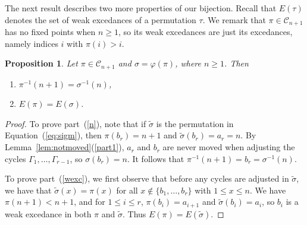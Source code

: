 \documentclass[11pt]{amsart}
\newtheorem{prop}[theorem]{Proposition}
\newcommand\ben{\begin{enumerate}}
\newcommand\een{\end{enumerate}}
\newcommand\C{\mathcal C}
\newcommand\wt{\widetilde}
\newcommand\bij{\varphi}
\newcommand\sigm{\wt\sigma}
\begin{document}
The next result describes two more properties of our bijection. Recall that $E(\tau)$ denotes the set of weak excedances of a permutation $\tau$.
We remark that $\pi\in\C_{n+1}$ has no fixed points when $n\ge1$, so its weak excedances are just its excedances, namely indices $i$ with $\pi(i)>i$.

\begin{prop}\label{prop:properties}
Let $\pi\in\C_{n+1}$ and $\sigma=\bij(\pi)$, where $n\ge1$. Then \ben
\item\label{n} $\pi^{-1}(n+1)=\sigma^{-1}(n)$,
\item\label{wexc} $E(\pi)=E(\sigma)$.
\een
\end{prop}

\begin{proof}
To prove part~(\ref{n}), note that if $\sigm$ is the permutation in Equation~(\ref{eq:sigm}), then
$\pi(b_r)=n+1$ and $\sigm(b_r)=a_r=n$. By Lemma~\ref{lem:notmoved}(\ref{part1}), $a_r$ and $b_r$ are never moved when adjusting the cycles $\Gamma_1,\dots,\Gamma_{r-1}$, so $\sigma(b_r)=n$.
It follows that $\pi^{-1}(n+1)=b_r=\sigma^{-1}(n)$.

To prove part~(\ref{wexc}), we first observe that before any cycles are adjusted in $\sigm$, we have that $\sigm(x)=\pi(x)$ for all $x\notin\{b_1,\dots,b_r\}$ with $1\le x\le n$. We have $\pi(n+1)<n+1$,
and for $1\le i\le r$, $\pi(b_i)=a_{i+1}$ and $\sigm(b_i)=a_i$, so $b_i$ is a weak excedance in both $\pi$ and $\sigm$. Thus $E(\pi)=E(\sigm)$.


\end{proof}
\end{document}
